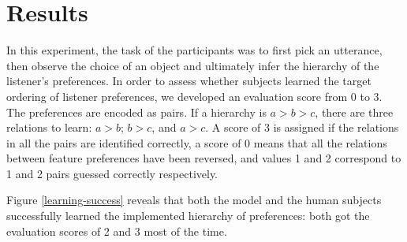 \documentclass[10pt,a4paper]{article}
\begin{document}

\section{Results}

In this experiment, the task of the participants was to first pick an utterance, then observe the choice of an object and ultimately infer the hierarchy of the listener's preferences. In order to assess whether subjects learned the target ordering of listener preferences, we developed an evaluation score from 0 to 3. The preferences are encoded as pairs. If a hierarchy is $ a > b > c $, there are three relations to learn:  $ a > b$; $ b > c $, and $ a >  c $. A score of 3 is assigned if the relations in all the pairs are identified correctly, a score of 0 means that all the relations between feature preferences have been reversed, and values 1 and 2 correspond to 1 and 2 pairs guessed correctly respectively.

Figure \ref{learning-success} reveals that both the model and the human subjects successfully learned the implemented hierarchy of preferences: both got the evaluation scores of 2 and 3 most of the time.
\end{document}
